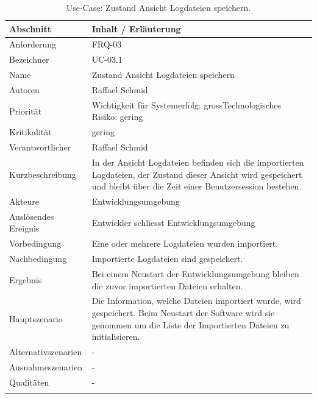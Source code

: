 \begin{longtable}{|p{4cm}|p{10.5cm}|}
\hline
   \textbf{Abschnitt} & \textbf{Inhalt / Erläuterung} \\\hline
   Anforderung & FRQ-03\\\hline
   Bezeichner & UC-03.1\\\hline
   Name & Zustand Ansicht Logdateien speichern\\\hline
   Autoren & Raffael Schmid\\\hline
   Priorität & Wichtigkeit für Systemerfolg: gross\newline Technologisches Risiko: gering\\\hline
   Kritikalität & gering\\\hline
   Verantwortlicher & Raffael Schmid\\\hline
   Kurzbeschreibung & In der Ansicht Logdateien befinden sich die importierten Logdateien, der Zustand dieser Ansicht wird gespeichert und bleibt über die Zeit einer Benutzersession bestehen.\\\hline
   Akteure & Entwicklungsumgebung\\\hline
   Auslösendes Ereignis & Entwickler schliesst Entwicklungsumgebung\\\hline
   Vorbedingung & Eine oder mehrere Logdateien wurden importiert.\\\hline
   Nachbedingung & Importierte Logdateien sind gespeichert. \\\hline
   Ergebnis & Bei einem Neustart der Entwicklungsumgebung bleiben die zuvor importierten Dateien erhalten.\\\hline
   Hauptszenario & Die Information, welche Dateien importiert wurde, wird gespeichert. Beim Neustart der Software wird sie genommen um die Liste der Importierten Dateien zu initialisieren.\\\hline
   Alternativszenarien & -\\\hline
   Ausnahmeszenarien & -\\\hline
   Qualitäten & -\\\hline
\caption{Use-Case: Zustand Ansicht Logdateien speichern.}
\end{longtable}


